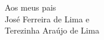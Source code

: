 

\vspace{20cm}



\begin{flushright}
Aos meus pais \\ 
José Ferreira de Lima e \\
Terezinha Araújo de Lima \dagger \\ 

\end{flushright} 




\clearpage
\pagebreak



